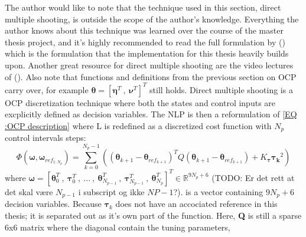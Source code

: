 The author would like to note that the technique used in this section, direct multiple shooting, is outside the scope of the author's knowledge.
Everything the author knows about this technique was learned over the course of the master thesis project, and it's highly recommended to read the full formulation by (\cite{breivik2017mpc})
which is the formulation that the implementation for this thesis heavily builds upon. Another great resource for direct multiple shooting are the video lectures of (\cite{gros2017Lecture}).
Also note that functions and definitions from the previous section on \gls{OCP} carry over, for example $\bm{\theta} = [\bm{\eta}^T \ , \ \bm{\nu}^T]^T$ still holds.\newline
Direct multiple shooting is a \gls{OCP} discretization technique where both the states and control inputs are excplicitly defined as decision variables.
The \gls{NLP} is then a reformulation of \eqref{EQ :OCP description} where L is redefined as a discretized cost function with $N_p$ control intervals steps:
\begin{equation} %
    \Phi(\bm{\omega}, \bm{\omega}_{ref_{1:N_p}}) = 
    \sum_{k=0}^{N_{p}-1} ((\bm{\theta}_{k+1} - \bm{\theta}_{ref_{k+1}})^T Q (\bm{\theta}_{k+1} - \bm{\theta}_{ref_{k+1}}) + K_{\bm{\tau}} \bm{\tau_k}^2)
\end{equation}
where $\bm{\omega} = [\bm{\theta}_0^T \ , \ \bm{\tau}_0^T \ , \ ... \ , \ \bm{\theta}_{N_{p-1}}^T \ , \ \bm{\tau}_{N_{p-1}}^T \ , \ \bm{\theta}_{N_{p}}^T]^T \in \mathbb{R}^{9N_{p}+6}$
(TODO: Er det rett at det skal være $N_{p-1}$ i subscript og ikke $NP-1$?).
is a vector containing $9N_p + 6$ decision variables. %
Because $\bm{\tau}_k$ does not have an accociated reference in this thesis; it is separated out as it's own part of the function.
Here, \textbf{Q} is still a sparse 6x6 matrix where the diagonal contain the tuning parameters,
